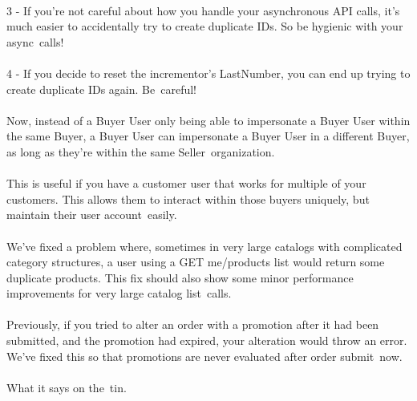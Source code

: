 \documentclass{memoir}%
\begin{document}
%
\paragraph*{}%
3 {-} If you’re not careful about how you handle your asynchronous API calls, it’s much easier to accidentally try to create duplicate IDs. So be hygienic with your async~calls! 

%
\paragraph*{}%
4 {-} If you decide to reset the incrementor’s LastNumber, you can end up trying to create duplicate IDs again. Be~careful!

%
\paragraph*{}%
Now, instead of a Buyer User only being able to impersonate a Buyer User within the same Buyer, a Buyer User can impersonate a Buyer User in a different Buyer, as long as they’re within the same Seller~organization. 

%
\paragraph*{}%
This is useful if you have a customer user that works for multiple of your customers. This allows them to interact within those buyers uniquely, but maintain their user account~easily.

%
\paragraph*{}%
We’ve fixed a problem where, sometimes in very large catalogs with complicated category structures, a user using a GET me/products list would return some duplicate products. This fix should also show some minor performance improvements for very large catalog list~calls.

%
\paragraph*{}%
Previously, if you tried to alter an order with a promotion after it had been submitted, and the promotion had expired, your alteration would throw an error. We’ve fixed this so that promotions are never evaluated after order submit~now.

%
\paragraph*{}%
What it says on the~tin. 
\end{document}
